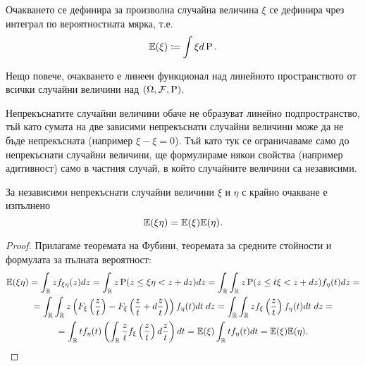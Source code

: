 \documentclass[numbers=endperiod, DIV=15, bibliography=totocnumbered]{scrartcl}
\begin{document}
\begin{note}
  Очакването се дефинира за произволна случайна величина $\xi$ се дефинира чрез интеграл по вероятностната мярка, т.е.
  \begin{displaymath}
    \mathbb{E}(\xi) \coloneqq \int \xi d\operatorname{P}.
  \end{displaymath}

  Нещо повече, очакването е линеен функционал над линейното пространството от всички случайни величини над $(\Omega, \mathcal{F}, \operatorname{P})$.

  Непрекъснатите случайни величини обаче не образуват линейно подпространство, тъй като сумата на две зависими непрекъснати случайни величини може да не бъде непрекъсната (например $\xi - \xi = 0$). Тъй като тук се ограничаваме само до непрекъснати случайни величини, ще формулираме някои свойства (например адитивност) само в частния случай, в който случайните величини са независими.
\end{note}

\begin{proposition}\label{thm:expect-product}
  За независими непрекъснати случайни величини $\xi$ и $\eta$ с крайно очакване е изпълнено
  \begin{displaymath}
    \mathbb{E}(\xi \eta) = \mathbb{E}(\xi) \mathbb{E}(\eta).
  \end{displaymath}
\end{proposition}
\begin{proof}
  Прилагаме теоремата на Фубини, теоремата за средните стойности и формулата за пълната вероятност:
  \begin{multline*}
    \mathbb{E}(\xi \eta)
    =
    \int_{\mathbb{R}} z f_{\xi \eta}(z) dz
    =
    \int_{\mathbb{R}} z \operatorname{P}(z \leq \xi \eta < z + dz) dz
    =
    \int_{\mathbb{R}} \int_{\mathbb{R}} z \operatorname{P}(z \leq t \xi < z + dz) f_\eta(t) dz
    = \\ =
    \int_{\mathbb{R}} \int_{\mathbb{R}} z \left( F_\xi\left(\frac z t \right) - F_\xi\left(\frac z t + d\frac z t \right) \right) f_\eta(t) dt \; dz
    =
    \int_{\mathbb{R}} \int_{\mathbb{R}} z f_\xi \left(\frac z t \right) f_\eta(t) dt \; dz
    = \\ =
    \int_{\mathbb{R}} t f_\eta(t) \left(\int_{\mathbb{R}} \frac z t f_\xi \left(\frac z t \right) d\frac z t \right) dt
    =
    \mathbb{E}(\xi) \int_{\mathbb{R}} t f_\eta(t) dt
    =
    \mathbb{E}(\xi) \mathbb{E}(\eta).
  \end{multline*}
\end{proof}
\end{document}
